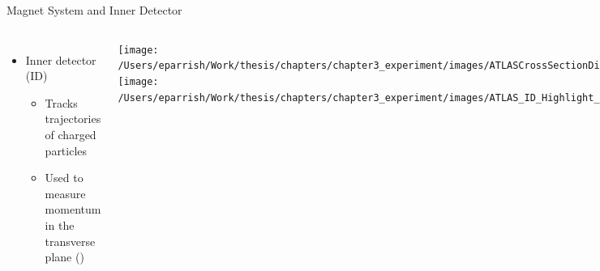 \documentclass[aspectratio=169,xcolor=table]{beamer}
\begin{document}
\begin{frame}[t]{Magnet System and Inner Detector}
\begin{columns}[t]
        \begin{itemize}
          \item Inner detector (ID) 
          \begin{itemize}
              \vspace{-.4cm}
              \item Tracks trajectories of charged particles
              \item Used to measure momentum in the transverse plane (\pt)
          \end{itemize}
        \end{itemize}
        \begin{columns}
        \texttt{[image: /Users/eparrish/Work/thesis/chapters/chapter3\_experiment/images/ATLASCrossSectionDiagram.png]}
              \texttt{[image: /Users/eparrish/Work/thesis/chapters/chapter3\_experiment/images/ATLAS\_ID\_Highlight\_Run2]}
        \end{columns}
        \centering

          \texttt{[image: /Users/eparrish/Work/thesis/chapters/chapter3\_experiment/images/ATLAS\_ID\_Run2]}
      \end{columns}
    \end{frame}
\end{document}
